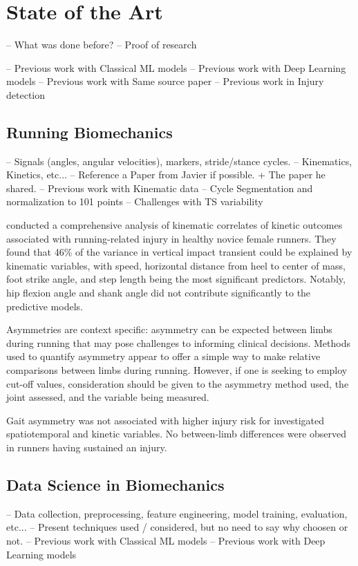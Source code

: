 \chapter{State of the Art}\label{chap:state-of-the-art}
-- What was done before?
-- Proof of research

-- Previous work with Classical ML models
-- Previous work with Deep Learning models
-- Previous work with Same source paper
-- Previous work in Injury detection

\section{Running Biomechanics}\label{sec:sota-biomechanics}
-- Signals (angles, angular velocities), markers, stride/stance cycles.
-- Kinematics, Kinetics, etc...
-- Reference a Paper from Javier if possible. + The paper he shared.
-- Previous work with Kinematic data
-- Cycle Segmentation and normalization to 101 points
    -- Challenges with TS variability

\cite{Napier2019} conducted a comprehensive analysis of kinematic correlates of kinetic outcomes associated with running-related injury in healthy novice female runners. They found that 46\% of the variance in vertical impact transient could be explained by kinematic variables, with speed, horizontal distance from heel to center of mass, foot strike angle, and step length being the most significant predictors. Notably, hip flexion angle and shank angle did not contribute significantly to the predictive models.


\citet{Vannatta2023} Asymmetries are context specific: asymmetry can be expected between limbs during running that may pose challenges to informing clinical decisions. Methods used to quantify asymmetry appear to offer a simple way to make relative comparisons between limbs during running. However, if one is seeking to employ cut-off values, consideration should be given to the asymmetry method used, the joint assessed, and the variable being measured.

\cite{Malisoux2024} Gait asymmetry was not associated with higher injury risk for investigated spatiotemporal and kinetic variables. No between-limb differences were observed in runners having sustained an injury.



\section{Data Science in Biomechanics}\label{sec:sota-data-science}
-- Data collection, preprocessing, feature engineering, model training, evaluation, etc...
-- Present techniques used / considered, but no need to say why choosen or not.
-- Previous work with Classical ML models
-- Previous work with Deep Learning models

